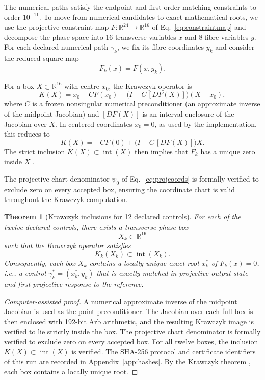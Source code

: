 \documentclass[11pt]{article}
\newtheorem{theorem}{Theorem}
\newcommand{\R}{\mathbb{R}}
\begin{document}
The numerical paths satisfy the endpoint and first-order matching constraints to order $10^{-11}$. To move from numerical candidates to exact mathematical roots, we use the projective constraint map $F:\R^{24}\to\R^{16}$ of Eq.~\eqref{eq:constraintmap} and decompose the phase space into 16 transverse variables $x$ and 8 fibre variables $y$. For each declared numerical path $\gamma_k$, we fix its fibre coordinates $y_k$ and consider the reduced square map
\[
F_k(x)=F(x,y_k).
\]

For a box $X\subset\R^{16}$ with centre $x_0$, the Krawczyk operator is
\begin{equation}
K(X)
=
x_0-CF(x_0)
+
\bigl(I-C\,[DF(X)]\bigr)(X-x_0),
\label{eq:krawczyk}
\end{equation}
where $C$ is a frozen nonsingular numerical preconditioner (an approximate inverse of the midpoint Jacobian) and $[DF(X)]$ is an interval enclosure of the Jacobian over $X$. In centered coordinates $x_0=0$, as used by the implementation, this reduces to
\[
K(X)=-CF(0)+\bigl(I-C\,[DF(X)]\bigr)X.
\]
The strict inclusion $K(X)\subset\operatorname{int}(X)$ then implies that $F_k$ has a unique zero inside $X$ \cite{Moore2009,Tucker2011}.

The projective chart denominator $\psi_0$ of Eq.~\eqref{eq:projcoords} is formally verified to exclude zero on every accepted box, ensuring the coordinate chart is valid throughout the Krawczyk computation.

\begin{theorem}[Krawczyk inclusions for 12 declared controls]
\label{thm:krawczyk}
For each of the twelve declared controls, there exists a transverse phase box
\[
X_k\subset\R^{16}
\]
such that the Krawczyk operator satisfies
\[
K_k(X_k)\subset\operatorname{int}(X_k).
\]
Consequently, each box $X_k$ contains a locally unique exact root $x_k^*$ of $F_k(x)=0$, i.e., a control $\gamma_k^*=(x_k^*,y_k)$ that is exactly matched in projective output state and first projective response to the reference.
\end{theorem}

\begin{proof}[Computer-assisted proof]
A numerical approximate inverse of the midpoint Jacobian is used as the point preconditioner. The Jacobian over each full box is then enclosed with 192-bit Arb arithmetic, and the resulting Krawczyk image is verified to lie strictly inside the box. The projective chart denominator is formally verified to exclude zero on every accepted box. For all twelve boxes, the inclusion $K(X)\subset\operatorname{int}(X)$ is verified. The SHA-256 protocol and certificate identifiers of this run are recorded in Appendix~\ref{app:hashes}. By the Krawczyk theorem \cite{Moore2009,Tucker2011,Tucker2002}, each box contains a locally unique root.
\end{proof}
\end{document}
